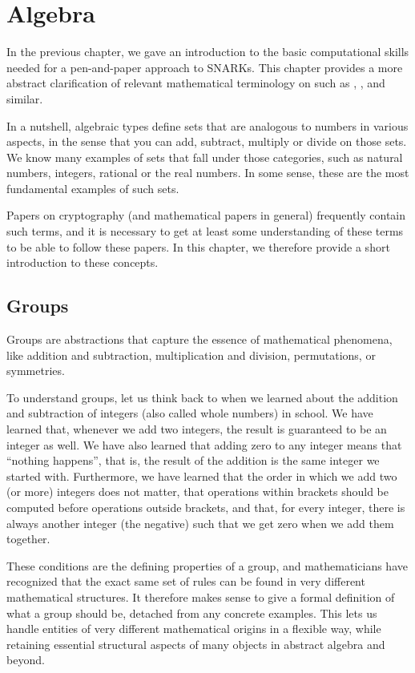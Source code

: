 \chapter{Algebra}

In the previous chapter, we gave an introduction to the basic computational skills needed for a pen-and-paper approach to SNARKs. This chapter provides a more abstract clarification of  relevant mathematical terminology on  such as , ,  and similar.

In a nutshell, algebraic types define sets that are analogous to numbers in various aspects, in the sense that you can add, subtract, multiply or divide on those sets.
We know many examples of sets that fall under those categories, such as natural numbers, integers,  rational or the real numbers. In some sense, these are the most fundamental examples of such sets.

Papers on cryptography (and mathematical papers in general) frequently contain such terms, and it is necessary to get at least some understanding of these terms to be able to follow these papers.
In this chapter, we therefore provide a short introduction to these concepts.

\section{Groups}\label{sec:groups}
 Groups are abstractions that capture the essence of mathematical phenomena, like addition and subtraction, multiplication and division, permutations, or symmetries.

To understand groups, let us think back to when we learned about the addition and subtraction of integers (also called whole numbers) in school. We have learned that, whenever we add two integers, the result is guaranteed to be an integer as well. We have also learned that adding zero to any integer means that ``nothing happens'', that is, the result of the addition is the same integer we started with. Furthermore, we have learned that the order in which we add two (or more) integers does not matter, that operations within brackets should be computed before operations outside brackets, and that, for every integer, there is always another integer (the negative) such that we get zero when we add them together.

These conditions are the defining properties of a group, and mathematicians have recognized that the exact same set of rules can be found in very different mathematical structures. It therefore makes sense to give a formal definition of what a group should be, detached from any concrete examples. This lets us handle entities of very different mathematical origins in a flexible way, while retaining essential structural aspects of many objects in abstract algebra and beyond.

